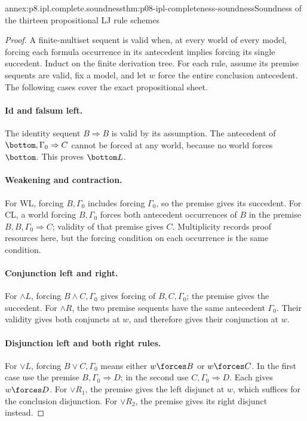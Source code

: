 \begin{annexitem}{annex:p8.ipl.complete.soundness}{thm:p08-ipl-completeness-soundness}{Soundness of the thirteen propositional LJ rule schemes}
\begin{proof}
A finite-multiset sequent is valid when, at every world of every model,
forcing each formula occurrence in its antecedent implies forcing its
single succedent. Induct on the finite derivation tree. For each rule,
assume its premise sequents are valid, fix a model, and let \(w\) force
the entire conclusion antecedent. The following cases cover the exact
propositional sheet.

\paragraph{Id and falsum left.}
The identity sequent \(B\Rightarrow B\) is valid by its assumption.
The antecedent of \(\bottom,\Gamma_0\Rightarrow C\) cannot be forced
at any world, because no world forces \(\bottom\). This proves
\(\bottom L\).

\paragraph{Weakening and contraction.}
For WL, forcing \(B,\Gamma_0\) includes forcing \(\Gamma_0\), so
the premise gives its succedent. For CL, a world forcing
\(B,\Gamma_0\) forces both antecedent occurrences of \(B\) in the
premise \(B,B,\Gamma_0\Rightarrow C\); validity of that premise
gives \(C\). Multiplicity records proof resources here, but the forcing
condition on each occurrence is the same condition.

\paragraph{Conjunction left and right.}
For \(\land L\), forcing \(B\land C,\Gamma_0\) gives forcing of
\(B,C,\Gamma_0\); the premise gives the succedent. For
\(\land R\), the two premise sequents have the same antecedent
\(\Gamma_0\). Their validity gives both conjuncts at \(w\), and
therefore gives their conjunction at \(w\).

\paragraph{Disjunction left and both right rules.}
For \(\lor L\), forcing \(B\lor C,\Gamma_0\) means either
\(w\forces B\) or \(w\forces C\). In the first case use the premise
\(B,\Gamma_0\Rightarrow D\); in the second use
\(C,\Gamma_0\Rightarrow D\). Each gives \(w\forces D\).
For \(\lor R_1\), the premise gives the left disjunct at \(w\),
which suffices for the conclusion disjunction. For \(\lor R_2\),
the premise gives its right disjunct instead.


\end{proof}
\end{annexitem}

